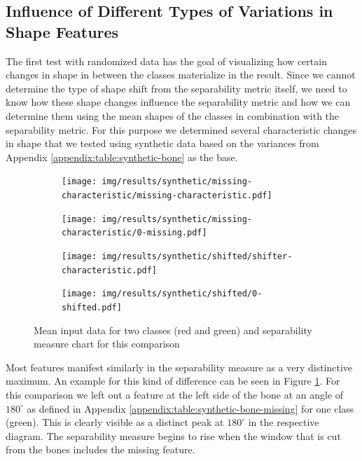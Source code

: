 \documentclass[pdftex,12pt,a4paper]{report}
\begin{document}
\subsection{Influence of Different Types of Variations in Shape Features}

The first test with randomized data has the goal of visualizing how certain changes in shape in between the classes materialize in the result. Since we cannot determine the type of shape shift from the separability metric itself, we need to know how these shape changes influence the separability metric and how we can determine them using the mean shapes of the classes in combination with the separability metric. For this purpose we determined several characteristic changes in shape that we tested using synthetic data based on the variances from Appendix \ref{appendix:table:synthetic-bone} as the base.

\begin{figure}[h]
	\centering
	\begin{subfigure}[b]{0.45\textwidth}
		\centering
		\texttt{[image: img/results/synthetic/missing-characteristic/missing-characteristic.pdf]}
		\label{fig:diff:missing}
	\end{subfigure}
	\begin{subfigure}[b]{0.45\textwidth}
		\centering
		\texttt{[image: img/results/synthetic/missing-characteristic/0-missing.pdf]}
		\subcaption*{}
		\label{}
	\end{subfigure}
	\begin{subfigure}[b]{0.45\textwidth}
		\centering
		\texttt{[image: img/results/synthetic/shifted/shifter-characteristic.pdf]}
		\label{fig:diff:shifted}
	\end{subfigure}
	\begin{subfigure}[b]{0.45\textwidth}
		\centering
		\texttt{[image: img/results/synthetic/shifted/0-shifted.pdf]}
		\subcaption*{}
		\label{}
	\end{subfigure}
	\caption{Mean input data for two classes (red and green) and separability measure chart for this comparison}
	\label{fig:slic}
\end{figure}

Most features manifest similarly in the separability measure as a very distinctive maximum. An example for this kind of difference can be seen in Figure \ref{fig:diff:missing}. For this comparison we left out a feature at the left side of the bone at an angle of $180^\circ$ as defined in Appendix \ref{appendix:table:synthetic-bone-missing} for one class (green). This is clearly visible as a distinct peak at $180^\circ$ in the respective diagram. The separability measure begins to rise when the window that is cut from the bones includes the missing feature.  
\end{document}

